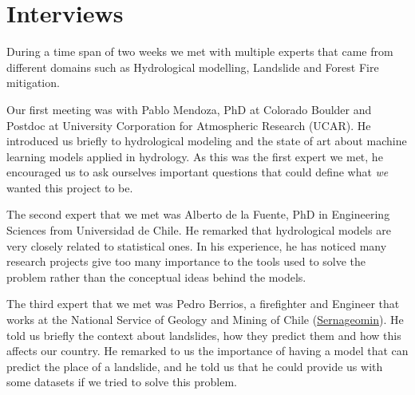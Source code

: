\documentclass[sigconf, nonacm]{acmart}
\begin{document}
\maketitle

\section{Interviews}


During a time span of two weeks we met with multiple experts that came from different domains such as Hydrological modelling, Landslide and Forest Fire mitigation. %

Our first meeting was with Pablo Mendoza, PhD at Colorado Boulder and Postdoc at University Corporation for Atmospheric Research (UCAR). He introduced us briefly to hydrological modeling and the state of art about machine learning models applied in hydrology. As this was the first expert we met, he encouraged us to ask ourselves important questions that could define what \textit{we} wanted this project to be. 

The second expert that we met was Alberto de la Fuente, PhD in Engineering Sciences from Universidad de Chile. He remarked that hydrological models are very closely related to statistical ones. In his experience, he has noticed many research projects give too many importance to the tools used to solve the problem rather than the conceptual ideas behind the models.

The third expert that we met was Pedro Berrios, a firefighter and Engineer that works at the National Service of Geology and Mining of Chile  (\href{https://www.sernageomin.cl/}{Sernageomin}). He told us briefly the context about landslides, how they predict them and how this affects our country. He remarked to us the importance of having a model that can predict the place of a landslide, and he told us that he could provide us with some datasets if we tried to solve this problem. 
\end{document}
